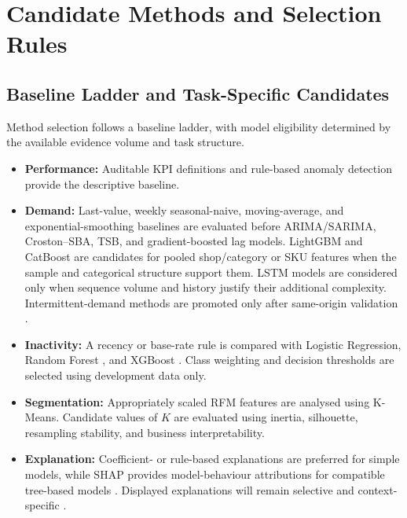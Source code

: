 \documentclass[a4paper,11pt,oneside]{book}
\theoremstyle{plain}
\theoremstyle{definition}
\theoremstyle{remark}
\begin{document}
\section{Candidate Methods and Selection Rules}
\label{sec:candidate_methods}


\subsection{Baseline Ladder and Task-Specific Candidates}

Method selection follows a baseline ladder, with model eligibility determined by
the available evidence volume and task structure.

\begin{itemize}

    \item \textbf{Performance:}
    Auditable KPI definitions and rule-based anomaly detection provide the
    descriptive baseline.

    \item \textbf{Demand:}
    Last-value, weekly seasonal-naive, moving-average, and exponential-smoothing
    baselines are evaluated before ARIMA/SARIMA, Croston--SBA, TSB, and
    gradient-boosted lag models. LightGBM and CatBoost are candidates for pooled
    shop/category or SKU features when the sample and categorical structure
    support them. LSTM models are considered only when sequence volume and
    history justify their additional complexity. Intermittent-demand methods
    are promoted only after same-origin validation
    \cite{croston1972intermittent,syntetos2005intermittent,teunter2011demand,
    ke2017lightgbm}.

    \item \textbf{Inactivity:}
    A recency or base-rate rule is compared with Logistic Regression,
    Random Forest \cite{breiman2001rf}, and XGBoost
    \cite{chen2016xgboost}. Class weighting and decision thresholds are selected
    using development data only.

    \item \textbf{Segmentation:}
    Appropriately scaled RFM features are analysed using K-Means. Candidate
    values of \(K\) are evaluated using inertia, silhouette, resampling
    stability, and business interpretability.

    \item \textbf{Explanation:}
    Coefficient- or rule-based explanations are preferred for simple models,
    while SHAP provides model-behaviour attributions for compatible tree-based
    models \cite{lundberg2017shap}. Displayed explanations will remain selective
    and context-specific \cite{miller2019explanation}.

\end{itemize}
\end{document}
